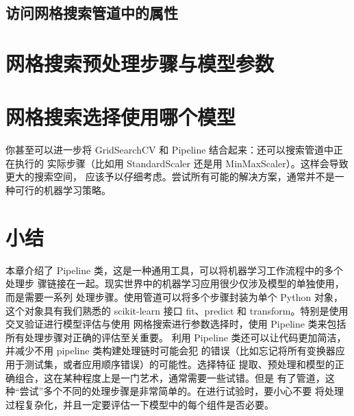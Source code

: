 \subsection{访问网格搜索管道中的属性}
\section{网格搜索预处理步骤与模型参数}
\section{网格搜索选择使用哪个模型}
你甚至可以进一步将 GridSearchCV 和 Pipeline 结合起来：还可以搜索管道中正在执行的
实际步骤（比如用 StandardScaler 还是用 MinMaxScaler）。这样会导致更大的搜索空间，
应该予以仔细考虑。尝试所有可能的解决方案，通常并不是一种可行的机器学习策略。
\section{小结}
本章介绍了 Pipeline 类，这是一种通用工具，可以将机器学习工作流程中的多个处理步
骤链接在一起。现实世界中的机器学习应用很少仅涉及模型的单独使用，而是需要一系列
处理步骤。使用管道可以将多个步骤封装为单个 Python 对象，这个对象具有我们熟悉的
scikit-learn 接口 fit、predict 和 transform。特别是使用交叉验证进行模型评估与使用
网格搜索进行参数选择时，使用 Pipeline 类来包括所有处理步骤对正确的评估至关重要。
利用 Pipeline 类还可以让代码更加简洁，并减少不用 pipeline 类构建处理链时可能会犯
的错误（比如忘记将所有变换器应用于测试集，或者应用顺序错误）的可能性。选择特征
提取、预处理和模型的正确组合，这在某种程度上是一门艺术，通常需要一些试错。但是
有了管道，这种“尝试”多个不同的处理步骤是非常简单的。在进行试验时，要小心不要
将处理过程复杂化，并且一定要评估一下模型中的每个组件是否必要。